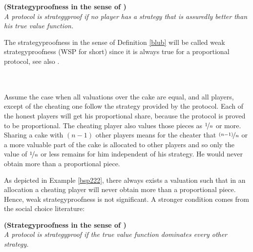 \begin{defi}{\textbf{(Strategyproofness in the sense of \cite{pie})}}\\
\label{blub}
\emph{A protocol is \emph{strategyproof} if no player has a strategy that is assuredly better than his true value function.}
\end{defi}
The strategyproofness in the sense of Definition \ref{blub} will be called weak strategyproofness (WSP for short) since it is always true for a proportional protocol, see also \cite{ccc}.
\begin{bsp}
\label{bsp222}
\textcolor{white}{x}\\\\
Assume the case when all valuations over the cake are equal, and all players, except of the cheating one follow the strategy provided by the protocol. Each of the honest players will get his proportional share, because the protocol is proved to be proportional. The cheating player also values those pieces as $\nicefrac{1}{n}$ or more. Sharing a cake with $(n-1)$ other players means for the cheater that $\nicefrac{(n-1)}{n}$ or a more valuable part of the cake is allocated to other players and so only the value of $\nicefrac{1}{n}$ or less remains for him independent of his strategy. He would never obtain more than a proportional piece.
\end{bsp}
%
%
As depicted in Example \ref{bsp222}, there always exists a valuation such that in an allocation a cheating player will never obtain more than a proportional piece. Hence, weak strategyproofness is not significant.
\newline
A stronger condition comes from the social choice literature:

\begin{defi}{\textbf{(Strategyproofness in the sense of \cite{why})}}\\
\label{laberlaberlaber}
\emph{A protocol is \emph{strategyproof} if the true value function dominates every other strategy.}
\end{defi}

